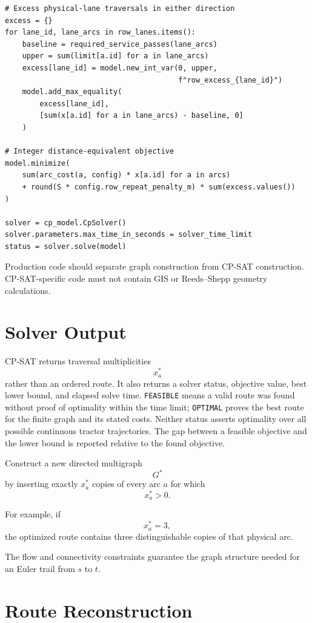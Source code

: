 \documentclass{article}
\begin{document}
\begin{verbatim}
# Excess physical-lane traversals in either direction
excess = {}
for lane_id, lane_arcs in row_lanes.items():
    baseline = required_service_passes(lane_arcs)
    upper = sum(limit[a.id] for a in lane_arcs)
    excess[lane_id] = model.new_int_var(0, upper,
                                        f"row_excess_{lane_id}")
    model.add_max_equality(
        excess[lane_id],
        [sum(x[a.id] for a in lane_arcs) - baseline, 0]
    )

# Integer distance-equivalent objective
model.minimize(
    sum(arc_cost(a, config) * x[a.id] for a in arcs)
    + round(S * config.row_repeat_penalty_m) * sum(excess.values())
)

solver = cp_model.CpSolver()
solver.parameters.max_time_in_seconds = solver_time_limit
status = solver.solve(model)
\end{verbatim}

Production code should separate graph construction from CP-SAT construction. CP-SAT-specific code must not contain GIS or Reeds--Shepp geometry calculations.

\section{Solver Output}

CP-SAT returns traversal multiplicities
$$
x_a^*
$$
rather than an ordered route.
It also returns a solver status, objective value, best lower bound, and elapsed solve time. \texttt{FEASIBLE} means a valid route was found without proof of optimality within the time limit; \texttt{OPTIMAL} proves the best route for the finite graph and its stated costs. Neither status asserts optimality over all possible continuous tractor trajectories. The gap between a feasible objective and the lower bound is reported relative to the found objective.

Construct a new directed multigraph
$$
G^*
$$
by inserting exactly $x_a^*$ copies of every arc $a$ for which
$$
x_a^*>0.
$$

For example, if
$$
x_a^*=3,
$$
the optimized route contains three distinguishable copies of that physical arc.

The flow and connectivity constraints guarantee the graph structure needed for an Euler trail from $s$ to $t$.

\section{Route Reconstruction}
\end{document}
